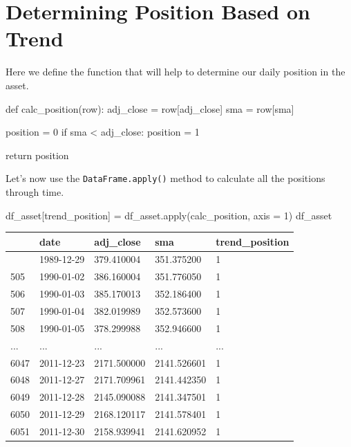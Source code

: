\documentclass[
  letterpaper,
  DIV=11,
  numbers=noendperiod]{scrreprt}
\newenvironment{Shaded}{\begin{snugshade}}{\end{snugshade}}
\newcommand{\BuiltInTok}[1]{\textcolor[rgb]{0.00,0.23,0.31}{#1}}
\newcommand{\ControlFlowTok}[1]{\textcolor[rgb]{0.00,0.23,0.31}{#1}}
\newcommand{\DecValTok}[1]{\textcolor[rgb]{0.68,0.00,0.00}{#1}}
\newcommand{\KeywordTok}[1]{\textcolor[rgb]{0.00,0.23,0.31}{#1}}
\newcommand{\NormalTok}[1]{\textcolor[rgb]{0.00,0.23,0.31}{#1}}
\newcommand{\OperatorTok}[1]{\textcolor[rgb]{0.37,0.37,0.37}{#1}}
\newcommand{\StringTok}[1]{\textcolor[rgb]{0.13,0.47,0.30}{#1}}
\begin{document}
\hypertarget{determining-position-based-on-trend}{%
\section{Determining Position Based on
Trend}\label{determining-position-based-on-trend}}

Here we define the function that will help to determine our daily
position in the asset.

\begin{Shaded}
\begin{Highlighting}[]
\KeywordTok{def}\NormalTok{ calc\_position(row):}
\NormalTok{    adj\_close }\OperatorTok{=}\NormalTok{ row[}\StringTok{\textquotesingle{}adj\_close\textquotesingle{}}\NormalTok{]}
\NormalTok{    sma }\OperatorTok{=}\NormalTok{ row[}\StringTok{\textquotesingle{}sma\textquotesingle{}}\NormalTok{]}

\NormalTok{    position }\OperatorTok{=} \DecValTok{0}
    \ControlFlowTok{if}\NormalTok{ sma }\OperatorTok{\textless{}}\NormalTok{ adj\_close:}
\NormalTok{        position }\OperatorTok{=} \DecValTok{1}

    \ControlFlowTok{return}\NormalTok{ position}
\end{Highlighting}
\end{Shaded}

Let's now use the \texttt{DataFrame.apply()} method to calculate all the
positions through time.

\begin{Shaded}
\begin{Highlighting}[]
\NormalTok{df\_asset[}\StringTok{\textquotesingle{}trend\_position\textquotesingle{}}\NormalTok{] }\OperatorTok{=}\NormalTok{ df\_asset.}\BuiltInTok{apply}\NormalTok{(calc\_position, axis }\OperatorTok{=} \DecValTok{1}\NormalTok{)}
\NormalTok{df\_asset}
\end{Highlighting}
\end{Shaded}

\begin{longtable}[]{@{}lllll@{}}
\toprule\noalign{}
& date & adj\_close & sma & trend\_position \\
\midrule\noalign{}
\endhead
\bottomrule\noalign{}
\endlastfoot
504 & 1989-12-29 & 379.410004 & 351.375200 & 1 \\
505 & 1990-01-02 & 386.160004 & 351.776050 & 1 \\
506 & 1990-01-03 & 385.170013 & 352.186400 & 1 \\
507 & 1990-01-04 & 382.019989 & 352.573600 & 1 \\
508 & 1990-01-05 & 378.299988 & 352.946600 & 1 \\
... & ... & ... & ... & ... \\
6047 & 2011-12-23 & 2171.500000 & 2141.526601 & 1 \\
6048 & 2011-12-27 & 2171.709961 & 2141.442350 & 1 \\
6049 & 2011-12-28 & 2145.090088 & 2141.347501 & 1 \\
6050 & 2011-12-29 & 2168.120117 & 2141.578401 & 1 \\
6051 & 2011-12-30 & 2158.939941 & 2141.620952 & 1 \\
\end{longtable}
\end{document}

